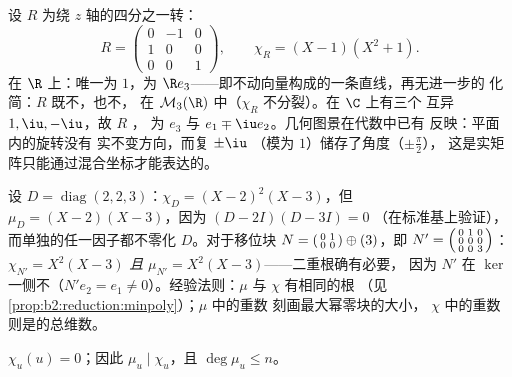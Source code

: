 \begin{example}\label{ex:b2:reduction:rotation3d}
设 $R$ 为绕 $z$ 轴的四分之一转：
\[
R = \begin{pmatrix}
0 & -1 & 0\\
1 & 0 & 0\\
0 & 0 & 1
\end{pmatrix},
\qquad
\chi_R = (X - 1)(X^2 + 1).
\]
在 $\R$ 上：唯一为 $1$，为
$\R e_3$——即不动向量构成的一条直线，再无进一步的
化简：$R$ 既不，也不，
在 $\mathcal{M}_3(\R)$ 中（$\chi_R$ 不分裂）。在 $\C$ 上有三个
互异 $1, \iu, -\iu$，故 $R$ ，
为 $e_3$ 与 $e_1 \mp \iu e_2$。几何图景在代数中已有
反映：平面内的旋转没有
实不变方向，而复 $\pm\iu$
（模为 $1$）储存了角度（$\pm\frac\pi2$），
这是实矩阵只能通过混合坐标才能表达的。
\end{example}

\begin{example}[极小多项式与特征多项式]\label{ex:b2:reduction:minvschar}
设 $D = \operatorname{diag}(2, 2, 3)$：$\chi_D = (X - 2)^2(X -
3)$，但 $\mu_D = (X - 2)(X - 3)$，因为 $(D - 2I)(D - 3I) = 0$
（在标准基上验证），而单独的任一因子都不零化
$D$。对于移位块 $N = \begin{psmallmatrix}0 & 1\\ 0 &
0\end{psmallmatrix} \oplus (3)$，即 $N' =
\begin{psmallmatrix}0 & 1 & 0\\ 0 & 0 & 0\\ 0 & 0 &
3\end{psmallmatrix}$：$\chi_{N'} = X^2(X - 3)$ \emph{且}
$\mu_{N'} = X^2(X - 3)$——二重根确有必要，
因为 $N'$ 在 $\ker$ 一侧不（$N'e_2 =
e_1 \neq 0$）。经验法则：$\mu$ 与 $\chi$ 有相同的根
（见\cref{prop:b2:reduction:minpoly}）；$\mu$ 中的重数
刻画最大幂零块的大小，
$\chi$ 中的重数则是的总维数。
\end{example}

\begin{theorem}[凯莱--哈密顿]\label{thm:b2:reduction:cayleyhamilton}
$\chi_u(u) = 0$；因此 $\mu_u \mid \chi_u$，且 $\deg \mu_u
\leq n$。
\end{theorem}

